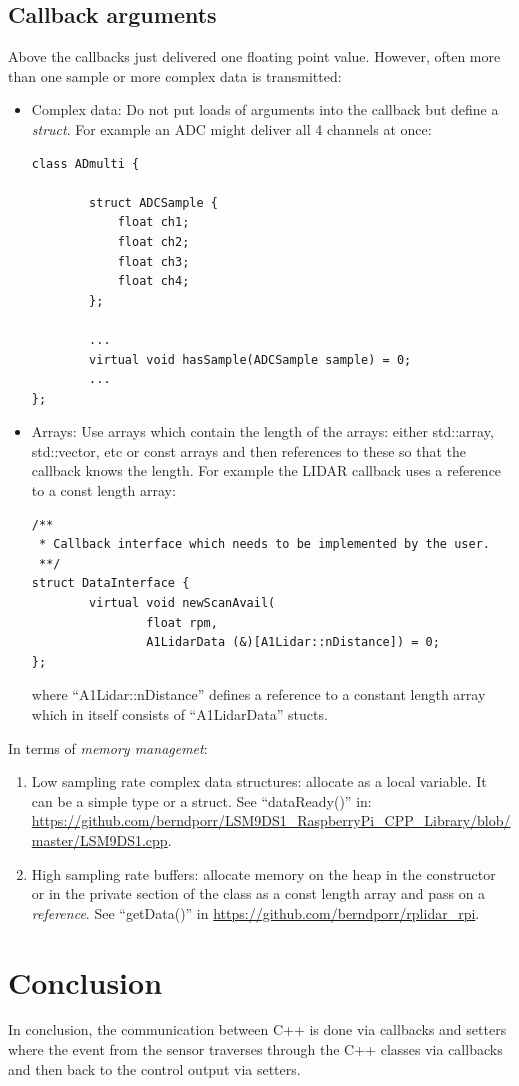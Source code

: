 \documentclass[12pt]{report}
\begin{document}
\subsection{Callback arguments}
Above the callbacks just delivered one floating point value. However,
often more than one sample or more complex data is transmitted:
\begin{itemize}
\item Complex data: Do not put loads of arguments into the
  callback but define a \textsl{struct}. For example an ADC might
  deliver all 4 channels at once:
\begin{verbatim}
class ADmulti {

        struct ADCSample {
            float ch1;
            float ch2;
            float ch3;
            float ch4;
        };

        ...
        virtual void hasSample(ADCSample sample) = 0;
        ...
};
\end{verbatim}
\item Arrays: Use arrays which contain the length of the arrays:
  either std::array, std::vector, etc or const arrays and then
  references to these so that the callback knows the length.
  For example the LIDAR callback uses a reference to a const length
  array:
\begin{verbatim}
/**
 * Callback interface which needs to be implemented by the user.
 **/
struct DataInterface {
        virtual void newScanAvail(
                float rpm, 
                A1LidarData (&)[A1Lidar::nDistance]) = 0;
};
\end{verbatim}
where ``A1Lidar::nDistance'' defines a reference to a constant length array which in
itself consists of ``A1LidarData'' stucts.
\end{itemize}
In terms of \textsl{memory managemet}:
\begin{enumerate}
\item Low sampling rate complex data structures: allocate as a local variable. It can be a simple type
  or a struct. See ``dataReady()'' in: \url{https://github.com/berndporr/LSM9DS1_RaspberryPi_CPP_Library/blob/master/LSM9DS1.cpp}.
\item High sampling rate buffers: allocate memory on the heap in the
  constructor or in the private section of the class as a const length
  array and pass on a \textsl{reference}. See ``getData()'' in
  \url{https://github.com/berndporr/rplidar_rpi}.
\end{enumerate}


\section{Conclusion}
In conclusion, the communication between C++ is done via callbacks and
setters where the event from the sensor traverses through the C++
classes via callbacks and then back to the control output via setters.
\end{document}
